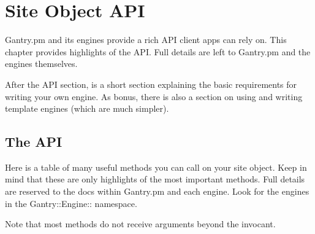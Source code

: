 \chapter{Site Object API}
\label{chap:site}

Gantry.pm and its engines provide a rich API client apps can rely on.
This chapter provides highlights of the API.  Full details are left
to Gantry.pm and the engines themselves.

After the API section, is a short section explaining the basic
requirements for writing your own engine.  As bonus, there is also a
section on using and writing template engines (which are much simpler).

\section{The API}

Here is a table of many useful methods you can call on your site object.
Keep in mind that these are only highlights of the most important methods.
Full details are reserved to the docs within Gantry.pm and each engine.
Look for the engines in the Gantry::Engine:: namespace.

Note that most methods do not receive arguments beyond the invocant.

